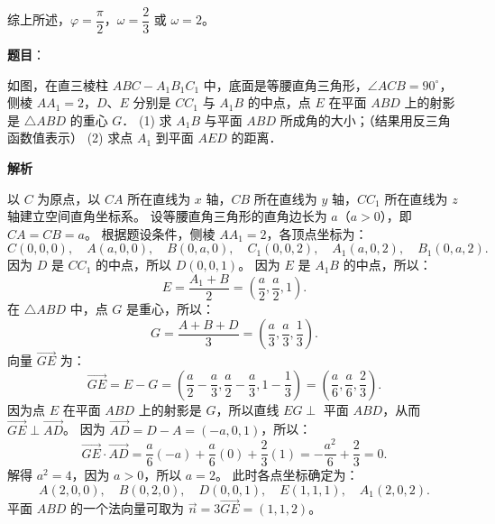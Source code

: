 \begin{answer}
综上所述，$\varphi = \dfrac{\pi}{2}$，$\omega = \dfrac{2}{3}$ 或 $\omega = 2$。


\end{answer}
\begin{answer}

\textbf{题目}：

如图，在直三棱柱 $ABC - A_1B_1C_1$ 中，底面是等腰直角三角形，$\angle ACB = 90^\circ$，侧棱 $AA_1 = 2$，$D$、$E$ 分别是 $CC_1$ 与 $A_1B$ 的中点，点 $E$ 在平面 $ABD$ 上的射影是 $\triangle ABD$ 的重心 $G$．
(1) 求 $A_1B$ 与平面 $ABD$ 所成角的大小；（结果用反三角函数值表示）
(2) 求点 $A_1$ 到平面 $AED$ 的距离．
\nopagebreak[4]
\begin{center}\end{center}
\nopagebreak[4]
\textbf{解析}

以 $C$ 为原点，以 $CA$ 所在直线为 $x$ 轴，$CB$ 所在直线为 $y$ 轴，$CC_1$ 所在直线为 $z$ 轴建立空间直角坐标系。
设等腰直角三角形的直角边长为 $a$（$a > 0$），即 $CA = CB = a$。
根据题设条件，侧棱 $AA_1 = 2$，各顶点坐标为：
\nopagebreak[4]
\[C(0, 0, 0), \quad A(a, 0, 0), \quad B(0, a, 0), \quad C_1(0, 0, 2), \quad A_1(a, 0, 2), \quad B_1(0, a, 2).\]
因为 $D$ 是 $CC_1$ 的中点，所以 $D(0, 0, 1)$。
因为 $E$ 是 $A_1B$ 的中点，所以：
\nopagebreak[4]
\[E = \frac{A_1 + B}{2} = \left(\frac{a}{2}, \frac{a}{2}, 1\right).\]
在 $\triangle ABD$ 中，点 $G$ 是重心，所以：
\nopagebreak[4]
\[G = \frac{A + B + D}{3} = \left(\frac{a}{3}, \frac{a}{3}, \frac{1}{3}\right).\]
向量 $\vec{GE}$ 为：
\nopagebreak[4]
\[\vec{GE} = E - G = \left(\frac{a}{2} - \frac{a}{3}, \frac{a}{2} - \frac{a}{3}, 1 - \frac{1}{3}\right) = \left(\frac{a}{6}, \frac{a}{6}, \frac{2}{3}\right).\]
因为点 $E$ 在平面 $ABD$ 上的射影是 $G$，所以直线 $EG \perp$ 平面 $ABD$，从而 $\vec{GE} \perp \vec{AD}$。
因为 $\vec{AD} = D - A = (-a, 0, 1)$，所以：
\nopagebreak[4]
\[\vec{GE} \cdot \vec{AD} = \frac{a}{6}(-a) + \frac{a}{6}(0) + \frac{2}{3}(1) = -\frac{a^2}{6} + \frac{2}{3} = 0.\]
解得 $a^2 = 4$，因为 $a > 0$，所以 $a = 2$。
此时各点坐标确定为：
\nopagebreak[4]
\[A(2, 0, 0), \quad B(0, 2, 0), \quad D(0, 0, 1), \quad E(1, 1, 1), \quad A_1(2, 0, 2).\]
平面 $ABD$ 的一个法向量可取为 $\vec{n} = 3\vec{GE} = (1, 1, 2)$。


\end{answer}
